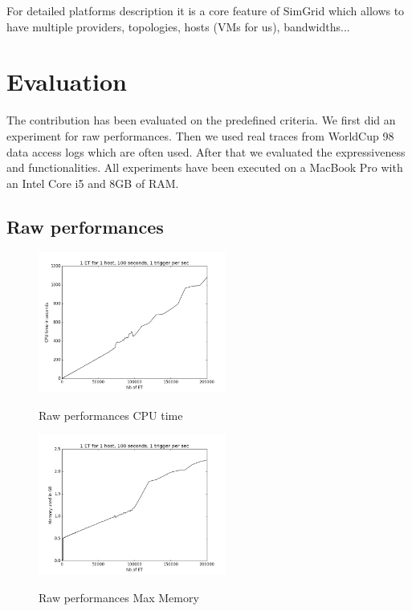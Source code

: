 \documentclass[a4paper, onecolumn]{article}
\begin{document}
  For detailed platforms description it is a core feature of SimGrid which 
  allows to have multiple providers, topologies, hosts (VMs for us), 
  bandwidths... %


\section{Evaluation} \label{eval}
  The contribution has been evaluated on the predefined criteria. We first did 
  an experiment for raw performances. Then we used real traces from WorldCup 98 
  data access logs \cite{wc98} which are often used. After that we evaluated 
  the expressiveness and functionalities. All experiments have been executed on 
  a MacBook Pro with an Intel Core i5 and 8GB of RAM.
    
  \subsection{Raw performances} \label{raw_perf}
    \begin{figure}
      \caption{Raw performances CPU time}
      \centering
      \includegraphics[width=0.55\textwidth]{../plots/raw_perf_time}
      \label{time_raw}
    \end{figure}
    \begin{figure}
      \caption{Raw performances Max Memory}
      \centering
      \includegraphics[width=0.55\textwidth]{../plots/raw_perf_mem}
      \label{mem_raw}
    \end{figure}
    
\end{document}
